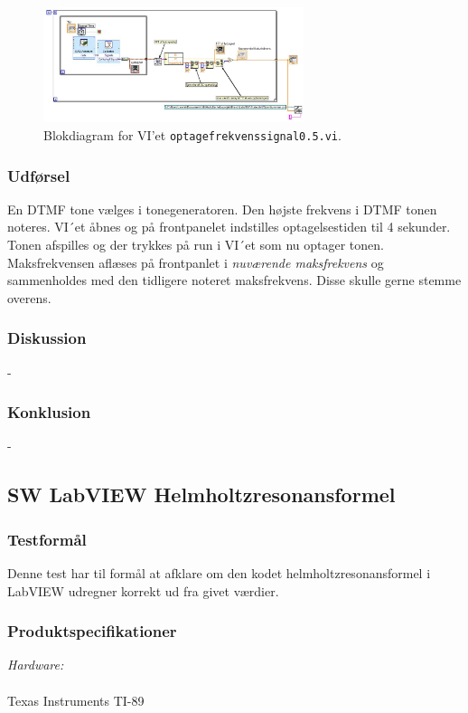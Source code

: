		\begin{figure}
			\centering
			\includegraphics[width=3in]{optagefrekvenssignal05}
			\caption{Blokdiagram for VI'et \texttt{optagefrekvenssignal0.5.vi}.}
			\label{fig:vio5}
		\end{figure}
	
		\subsubsection{Udførsel}
			En DTMF tone vælges i tonegeneratoren. Den højste frekvens i DTMF tonen noteres. VI´et åbnes og på frontpanelet indstilles optagelsestiden til 4 sekunder. Tonen afspilles og der trykkes på run i VI´et som nu optager tonen. Maksfrekvensen aflæses på frontpanlet i \textit{nuværende maksfrekvens} og sammenholdes med den tidligere noteret maksfrekvens. Disse skulle gerne stemme overens. 

		\subsubsection{Diskussion} 
	-
	
	
		\subsubsection{Konklusion}
		 
	- 

\subsection{SW LabVIEW Helmholtzresonansformel}	
\subsubsection{Testformål}
		Denne test har til formål at afklare om den kodet helmholtzresonansformel i LabVIEW udregner korrekt ud fra givet værdier. 
		\subsubsection{Produktspecifikationer}
	
		\textit{Hardware:}\\
		\PC\\
		Texas Instruments TI-89
	
